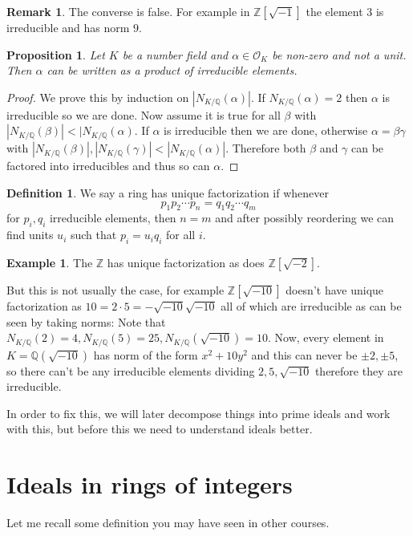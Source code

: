 \documentclass[11pt,a4paper]{report}
\theoremstyle{plain}
\newtheorem{prop}[subsection]{Proposition}
\theoremstyle{definition}
\newtheorem{defn}[subsection]{Definition}
\newtheorem{exmp}[subsection]{Example}
\theoremstyle{definition}
\newtheorem{rmrk}[subsection]{Remark}
\newcommand{\ZZ}{\mathbb{Z}}
\def\QQ{\mathbb{Q}}
\def \Nm {N_{K/\QQ}}
\def \a{\alpha}
\def \OO {\mathcal{O}}
\begin{document}
	
	\begin{rmrk}
		The converse is false. For example in $\ZZ[\sqrt{-1}]$ the element $3$ is irreducible and has norm $9$.
	\end{rmrk}
	
	\begin{prop}
		Let $K$ be a number field and $\a \in \OO_K$ be non-zero and not a unit. Then $\a$ can be written as a product of irreducible elements.
	\end{prop}
	
	\begin{proof}
		We prove this by induction on $|\Nm(\a)|$. If $\Nm(\a)=2$ then $\a$ is irreducible so we are done. Now assume it is true for all $\beta$ with $|\Nm(\beta)|< |\Nm(\a)$. If $\a$ is irreducible then we are done, otherwise $\a=\beta \gamma$ with $|\Nm(\beta)|, |\Nm(\gamma)|< |\Nm(\a)|$. Therefore both $\beta$ and $\gamma$ can be factored into irreducibles and thus so can $\a$.
	\end{proof}
	
	\begin{defn}
		We say a ring has unique factorization if whenever \[p_1p_2\cdots p_n=q_1q_2\cdots q_m\] for $p_i,q_i$ irreducible elements, then $n=m$ and after possibly reordering we can find units $u_i$ such that $p_i=u_iq_i$ for all $i$.
	\end{defn}
	
	\begin{exmp}
		The $\ZZ$ has unique factorization as does $\ZZ[\sqrt{-2}]$. 
		
		But this is not usually the case, for example $\ZZ[\sqrt{-10}]$ doesn't have unique factorization as $10=2 \cdot 5= -\sqrt{-10}\sqrt{-10}$ all of which are irreducible as can be seen by taking norms: Note that $\Nm(2)=4,\Nm(5)=25, \Nm(\sqrt{-10})=10$. Now, every element in $K=\QQ(\sqrt{-10})$ has norm of the form $x^2+10y^2$ and this can never be $\pm 2, \pm 5$, so there can't be any irreducible elements dividing $2,5,\sqrt{-10}$ therefore they are irreducible.
	\end{exmp}
	
	In order to fix this, we will later decompose things into prime ideals and work with this, but before this we need to understand ideals better.
	
	
	\section{Ideals in rings of integers}
	
	
	Let me recall some definition you may have seen in other courses.
	
\end{document}
